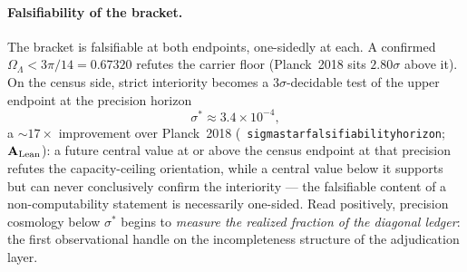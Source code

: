 \documentclass[11pt]{article}
\theoremstyle{remark}
\newcommand{\lean}[1]{%
  \penalty-100
  \begingroup\def\_{\textunderscore\allowbreak}\texttt{#1}\endgroup}
\newcommand{\OmL}{\Omega_\Lambda}
\newcommand{\CatAL}{\ensuremath{\textbf{A}_{\rm Lean}}}
\begin{document}
\paragraph{Falsifiability of the bracket.}
The bracket is falsifiable at both endpoints, one-sidedly at each. A confirmed
$\OmL < 3\pi/14 = 0.67320$ refutes the carrier floor (Planck~2018 sits
$2.80\sigma$ above it). On the census side, strict interiority becomes a
$3\sigma$-decidable test of the upper endpoint at the precision horizon
\begin{equation}
  \sigma^* \approx 3.4\times10^{-4},
  \label{eq:sigmastar}
\end{equation}
a ${\sim}17\times$ improvement over Planck~2018
\mbox{(\lean{sigma\_star\_falsifiability\_horizon}; \CatAL)}:
a future central value at or above the census endpoint at that precision
refutes the capacity-ceiling orientation, while a central value below it
supports but can never conclusively confirm the interiority --- the
falsifiable content of a non-computability statement is necessarily one-sided.
Read positively, precision cosmology below $\sigma^*$ begins to \emph{measure
the realized fraction of the diagonal ledger}: the first observational handle
on the incompleteness structure of the adjudication layer.
\end{document}
